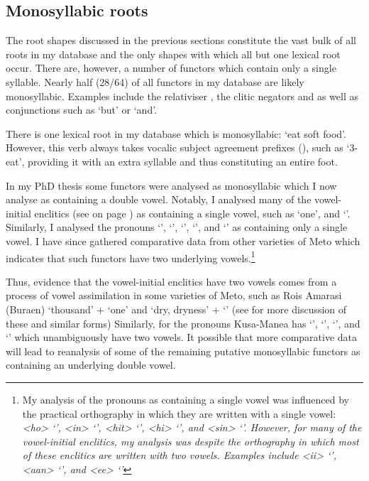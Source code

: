 \subsection{Monosyllabic roots}\label{sec:SinSylRoo}
The root shapes discussed in the previous sections
constitute the vast bulk of all roots in my database
and the only shapes with which all but one lexical root occur.
There are, however, a number of functors which
contain only a single syllable.
Nearly half (28/64) of all functors in my database are likely monosyllabic.
Examples include the relativiser ,
the clitic negators  and 
as well as conjunctions such as  `but' or  `and'.

There is one lexical root in my database
which is monosyllabic:  `eat soft food'.
However, this verb always takes vocalic subject agreement prefixes (),
such as  `3-eat', providing it with an extra
syllable and thus constituting an entire foot.

In my PhD thesis \citep{ed16b}
some functors were analysed as monosyllabic
which I now analyse as containing a double vowel.
Notably, I analysed many of the vowel-initial enclitics
(see  on page \pageref{tab2:AmaVowIniEnc})
as containing a single vowel, such as  `one', and  `{\ii}'.
Similarly, I analysed the pronouns  `{\hoo}',  `{\iin}',
 `{\hiit}',  `{\hii}', and  `{\siin}' as containing only a single vowel.
I have since gathered comparative data from other varieties
of Meto which indicates that such functors have two underlying vowels.\footnote{
		My analysis of the pronouns as containing a single vowel
		was influenced by the practical orthography in which they are written with a single vowel:
		 \it{<ho>} `{\hoo}',  \it{<in>} `{\iin}',  \it{<hit>} `{\hiit}',
		 \it{<hi>} `{\hii}', and  \it{<sin>} `{\siin}'.
		However, for many of the vowel-initial enclitics, my analysis was despite
		the orthography in which most of these enclitics are written with two vowels.
		Examples include  \it{<ii>} `{\ii}', 
		\it{<aan>} `{\aan}', and  \it{<ee>} `{\ee}'}

Thus, evidence that the vowel-initial enclitics have two vowels
comes from a process of vowel assimilation in some varieties of Meto,
such as Ro{\Q}is Amarasi (Buraen)  `thousand' +  `one' {\ra} 
and  `dry, dryness' +  `{\ii}' {\ra} 
(see  for more discussion of these and similar forms)
Similarly, for the pronouns Kusa-Manea has  `{\iin}',  `{\hiit}',
 `{\hii}', and  `{\siin}' which unambiguously have two vowels.
It possible that more comparative data will lead to
reanalysis of some of the remaining putative monosyllabic functors
as containing an underlying double vowel.